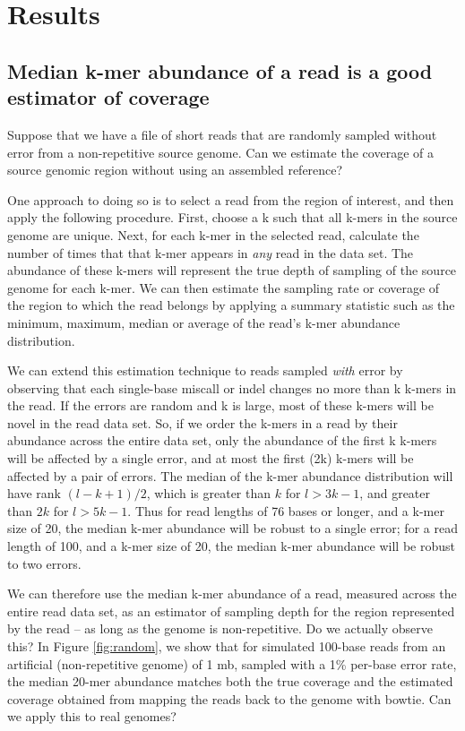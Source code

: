 \documentclass[10pt]{article}
\begin{document}
\section*{Results}

\subsection*{Median k-mer abundance of a read is a good estimator of coverage}

Suppose that we have a file of short reads that are randomly sampled
without error from a non-repetitive source genome.  Can we estimate
the coverage of a source genomic region without using an assembled
reference?

One approach to doing so is to select a read from the region of
interest, and then apply the following procedure. First, choose a k
such that all k-mers in the source genome are unique.  Next, for each
k-mer in the selected read, calculate the number of times that that
k-mer appears in {\em any} read in the data set.  The abundance of
these k-mers will represent the true depth of sampling of the source
genome for each k-mer.  We can then estimate the sampling rate or
coverage of the region to which the read belongs by applying a summary
statistic such as the minimum, maximum, median or average of the
read's k-mer abundance distribution.

We can extend this estimation technique to reads sampled {\em with}
error by observing that each single-base miscall or indel changes no
more than k k-mers in the read.  If the errors are random and k is
large, most of these k-mers will be novel in the read data set.  So,
if we order the k-mers in a read by their abundance across the entire
data set, only the abundance of the first k k-mers will be affected by
a single error, and at most the first (2k) k-mers will be affected by
a pair of errors.  The median of the k-mer abundance distribution will
have rank $(l - k + 1) / 2$, which is greater than $k$ for $l > 3k-1$,
and greater than $2k$ for $l > 5k-1$.  Thus for read lengths of 76
bases or longer, and a k-mer size of 20, the median k-mer abundance
will be robust to a single error; for a read length of 100, and a
k-mer size of 20, the median k-mer abundance will be robust to two
errors.

We can therefore use the median k-mer abundance of a read, measured
across the entire read data set, as an estimator of sampling depth for
the region represented by the read -- as long as the genome is
non-repetitive.  Do we actually observe this?  In Figure \ref{fig:random},
we show
that for simulated 100-base reads from an artificial (non-repetitive
genome) of 1 mb, sampled with a 1\% per-base error rate, the median
20-mer abundance matches both the true coverage and the estimated
coverage obtained from mapping the reads back to the genome with
bowtie.  Can we apply this to real genomes?
\end{document}

